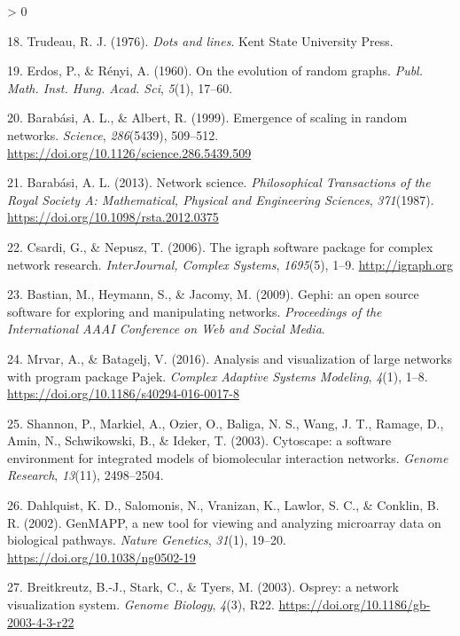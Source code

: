 \documentclass[
  12pt,
]{book}
\newlength{\cslhangindent}
\newenvironment{CSLReferences}[2] %
 {%
  \setlength{\parindent}{0pt}
  \ifodd #1 \everypar{\setlength{\hangindent}{\cslhangindent}}\ignorespaces\fi
  \ifnum #2 > 0
  \setlength{\parskip}{#2\baselineskip}
  \fi
 }%
 {}
\begin{document}
\begin{CSLReferences}{1}{0}
\leavevmode\hypertarget{ref-Trudeau1976}{}%
18. Trudeau, R. J. (1976). \emph{{Dots and lines}}. Kent State University Press.

\leavevmode\hypertarget{ref-Erdos1960}{}%
19. Erdos, P., \& Rényi, A. (1960). {On the evolution of random graphs}. \emph{Publ. Math. Inst. Hung. Acad. Sci}, \emph{5}(1), 17--60.

\leavevmode\hypertarget{ref-Barabasi1999}{}%
20. Barabási, A. L., \& Albert, R. (1999). {Emergence of scaling in random networks}. \emph{Science}, \emph{286}(5439), 509--512. \url{https://doi.org/10.1126/science.286.5439.509}

\leavevmode\hypertarget{ref-Barabasi2013}{}%
21. Barabási, A. L. (2013). {Network science}. \emph{Philosophical Transactions of the Royal Society A: Mathematical, Physical and Engineering Sciences}, \emph{371}(1987). \url{https://doi.org/10.1098/rsta.2012.0375}

\leavevmode\hypertarget{ref-Csardi2006}{}%
22. Csardi, G., \& Nepusz, T. (2006). {The igraph software package for complex network research}. \emph{InterJournal, Complex Systems}, \emph{1695}(5), 1--9. \url{http://igraph.org}

\leavevmode\hypertarget{ref-Bastian2009}{}%
23. Bastian, M., Heymann, S., \& Jacomy, M. (2009). {Gephi: an open source software for exploring and manipulating networks}. \emph{Proceedings of the International AAAI Conference on Web and Social Media}.

\leavevmode\hypertarget{ref-Mrvar2016}{}%
24. Mrvar, A., \& Batagelj, V. (2016). {Analysis and visualization of large networks with program package Pajek}. \emph{Complex Adaptive Systems Modeling}, \emph{4}(1), 1--8. \url{https://doi.org/10.1186/s40294-016-0017-8}

\leavevmode\hypertarget{ref-Shannon2003}{}%
25. Shannon, P., Markiel, A., Ozier, O., Baliga, N. S., Wang, J. T., Ramage, D., Amin, N., Schwikowski, B., \& Ideker, T. (2003). {Cytoscape: a software environment for integrated models of biomolecular interaction networks}. \emph{Genome Research}, \emph{13}(11), 2498--2504.

\leavevmode\hypertarget{ref-Dahlquist2002}{}%
26. Dahlquist, K. D., Salomonis, N., Vranizan, K., Lawlor, S. C., \& Conklin, B. R. (2002). {GenMAPP, a new tool for viewing and analyzing microarray data on biological pathways}. \emph{Nature Genetics}, \emph{31}(1), 19--20. \url{https://doi.org/10.1038/ng0502-19}

\leavevmode\hypertarget{ref-Breitkreutz2003}{}%
27. Breitkreutz, B.-J., Stark, C., \& Tyers, M. (2003). {Osprey: a network visualization system}. \emph{Genome Biology}, \emph{4}(3), R22. \url{https://doi.org/10.1186/gb-2003-4-3-r22}


\end{CSLReferences}
\end{document}
